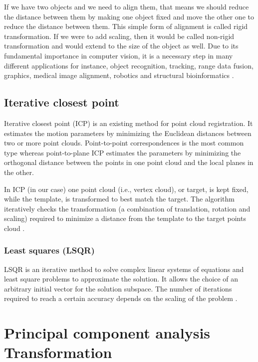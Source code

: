 \documentclass[../structure.tex]{subfiles}
\begin{document}
If we have two objects and we need to align them, that means we should reduce the distance between them by making one object fixed and move the other one to reduce the distance between them. This simple form of alignment is called rigid transformation. If we were to add scaling, then it would be called non-rigid transformation and would extend to the size of the object as well. Due to its fundamental importance in computer vision, it is a necessary step in many different applications for instance, object recognition, tracking, range data fusion, graphics, medical image alignment, robotics and structural bioinformatics \cite{Li2007}.

		\subsection{Iterative closest point}
		
		Iterative closest point (ICP) is an existing method for point cloud registration.  It estimates the motion parameters by minimizing the Euclidean distances between two or more point clouds. Point-to-point correspondences is the most common type whereas point-to-plane ICP estimates the parameters by minimizing the orthogonal distance between the points in one point cloud and the local planes in the other.
		
In ICP (in our case) one point cloud (i.e., vertex cloud), or target, is kept fixed, while the template, is transformed to best match the target. The algorithm iteratively checks the transformation (a combination of translation, rotation and scaling) required to minimize a distance from the template to the target points cloud \cite{Zhang1994}.

		 \subsubsection{Least squares (LSQR)}
		
		 LSQR is an iterative method to solve complex linear systems of equations and least square problems to approximate the solution. It allows the choice of an arbitrary initial vector for the solution subspace. The number of iterations required to reach a certain accuracy depends on the scaling of the problem \cite{Paige1982a}.

\section{Principal component analysis Transformation}
\end{document}

